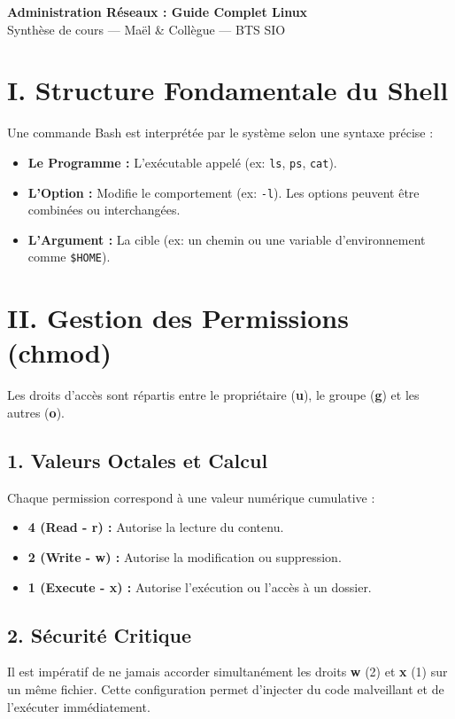 \documentclass[11pt,a4paper]{article}
\begin{document}
\begin{center}
    \LARGE \textbf{Administration Réseaux : Guide Complet Linux} \\
    \large Synthèse de cours — Maël \& Collègue — BTS SIO
\end{center}

\vspace{0.5cm}

\section{I. Structure Fondamentale du Shell}
Une commande Bash est interprétée par le système selon une syntaxe précise :
\begin{itemize}
    \item \textbf{Le Programme :} L'exécutable appelé (ex: \texttt{ls}, \texttt{ps}, \texttt{cat}).
    \item \textbf{L'Option :} Modifie le comportement (ex: \texttt{-l}). Les options peuvent être combinées ou interchangées.
    \item \textbf{L'Argument :} La cible (ex: un chemin ou une variable d'environnement comme \texttt{\$HOME}).
\end{itemize}

\section{II. Gestion des Permissions (chmod)}
Les droits d'accès sont répartis entre le propriétaire (\textbf{u}), le groupe (\textbf{g}) et les autres (\textbf{o}).

\subsection{1. Valeurs Octales et Calcul}
Chaque permission correspond à une valeur numérique cumulative :
\begin{itemize}
    \item \textbf{4 (Read - r) :} Autorise la lecture du contenu.
    \item \textbf{2 (Write - w) :} Autorise la modification ou suppression.
    \item \textbf{1 (Execute - x) :} Autorise l'exécution ou l'accès à un dossier.
\end{itemize}

\subsection{2. Sécurité Critique}
Il est impératif de ne jamais accorder simultanément les droits \textbf{w} (2) et \textbf{x} (1) sur un même fichier. Cette configuration permet d'injecter du code malveillant et de l'exécuter immédiatement.
\end{document}

